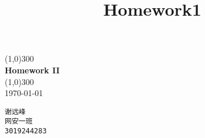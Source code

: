 \documentclass[UTF8,fleqn]{article}
\title{Homework1}
\begin{document}
\begin{titlepage}
	\begin{center}
		\line(1,0){300}\\
		[0.65cm]
		\huge{\bfseries Homework II }\\
		\line(1,0){300}\\
		\textnormal{\Large \today}\\
		[5.5cm]
	\end{center}
	\begin{flushright}
		\texttt{\Large 谢远峰\\网安一班\\3019244283}\\
		[0.5cm]
	\end{flushright}
\end{titlepage}
\clearpage


\end{document}
